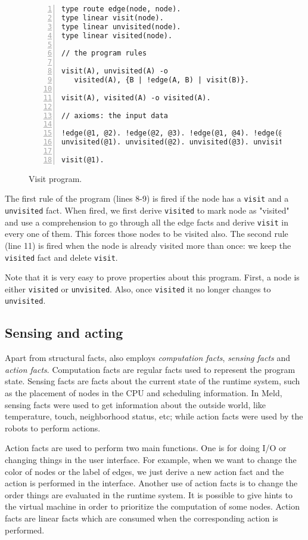 \begin{figure}[h!]
\small\begin{Verbatim}[numbers=left]
type route edge(node, node).
type linear visit(node).
type linear unvisited(node).
type linear visited(node).

// the program rules

visit(A), unvisited(A) -o
   visited(A), {B | !edge(A, B) | visit(B)}.

visit(A), visited(A) -o visited(A).

// axioms: the input data

!edge(@1, @2). !edge(@2, @3). !edge(@1, @4). !edge(@2, @4).
unvisited(@1). unvisited(@2). unvisited(@3). unvisited(@4).

visit(@1).
\end{Verbatim}
  \caption{Visit program.}
  \label{code:visit}
\end{figure}
\normalsize

The first rule of the program (lines 8-9) is fired if the node has a \texttt{visit} and a \texttt{unvisited} fact. When fired, we first derive \texttt{visited} to mark node as "visited" and use a
comprehension to go through all the edge facts and derive \texttt{visit} in every one of them.
This forces those nodes to be visited also. The second rule (line 11) is fired when the node is already
visited more than once: we keep the \texttt{visited} fact and delete \texttt{visit}.

Note that it is very easy to prove properties about this program. First, a node is either
\texttt{visited} or \texttt{unvisited}. Also, once \texttt{visited} it no longer changes to
\texttt{unvisited}.

\subsection{Sensing and acting}

Apart from structural facts, \lang also employs \emph{computation facts}, \emph{sensing facts}
and \emph{action facts}.
Computation facts are regular facts used to represent the program state.
Sensing facts are facts about the current state of the runtime system, such as the placement
of nodes in the CPU and scheduling information. In Meld, sensing facts
were used to get information about the outside world, like temperature, touch, neighborhood status,
etc; while action facts were used by the robots to perform actions.

Action facts are used to perform two main functions. One is for doing I/O or changing things
in the user interface. For example, when we want to change the color of nodes or the label
of edges, we just derive a new action fact and the action is performed in the interface.
Another use of action facts is to change the order things are evaluated in the runtime system.
It is possible to give hints to the virtual machine in order to prioritize the computation of
some nodes.
Action facts are linear facts which are consumed when the corresponding action is performed.

